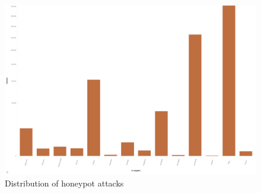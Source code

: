 \begin{figure}[h]
    \centering
    \includegraphics[width=\textwidth]{figures/tpot-overview-attacks.png}
    \caption[Distribution of honeypot attacks]{Distribution of honeypot attacks}
    \label{fig:overview-attacks}
\end{figure}

